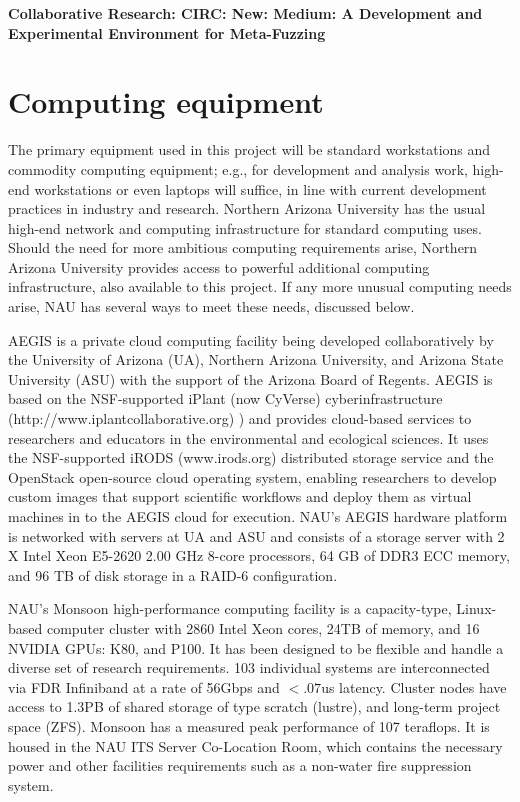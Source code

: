 \documentclass[12pt]{article}
\begin{document}
\begin{center}
{\Large\sf\textbf{Collaborative Research: CIRC: New: Medium: A Development and 
Experimental Environment for Meta-Fuzzing}}
\end{center}

\section*{Computing equipment}

The primary equipment used in this project will be standard workstations and 
commodity computing equipment; e.g., for development and analysis work, 
high-end workstations or even laptops will suffice, in line with current 
development practices in industry and research. Northern Arizona University has 
the usual high-end network and computing infrastructure for standard computing 
uses.  Should the need for more ambitious computing requirements arise, 
Northern Arizona University provides access to powerful additional computing 
infrastructure, also available to this project.   If any more unusual computing 
needs arise, NAU has several ways to meet these needs, discussed below.

AEGIS is a private cloud computing facility being developed collaboratively by 
the University of Arizona (UA), Northern Arizona University, and Arizona State 
University (ASU) with the support of the Arizona Board of Regents. AEGIS is 
based on the NSF-supported iPlant (now CyVerse) cyberinfrastructure 
(http://www.iplantcollaborative.org) ) and provides cloud-based services to 
researchers and educators in the environmental and ecological sciences. It uses 
the NSF-supported iRODS (www.irods.org) distributed storage service and the 
OpenStack open-source cloud operating system, enabling researchers to develop 
custom images that support scientific workflows and deploy them as virtual 
machines in to the AEGIS cloud for execution. NAU’s AEGIS hardware platform 
is networked with servers at UA and ASU and consists of a storage server with 2 
X Intel Xeon E5-2620 2.00 GHz 8-core processors, 64 GB of DDR3 ECC memory, and 
96 TB of disk storage in a RAID-6 configuration.

NAU’s Monsoon high-performance computing facility is a capacity-type, 
Linux-based computer cluster with 2860 Intel Xeon cores, 24TB of memory, and 16 
NVIDIA GPUs: K80, and P100. It has been designed to be flexible and handle a 
diverse set of research requirements. 103 individual systems are interconnected 
via FDR Infiniband at a rate of 56Gbps and $<.07$us latency. Cluster nodes have 
access to 1.3PB of shared storage of type scratch (lustre), and long-term 
project space (ZFS). Monsoon has a measured peak performance of 107 teraflops. 
It is housed in the NAU ITS Server Co-Location Room, which contains the 
necessary power and other facilities requirements such as a non-water fire 
suppression system.
\end{document}
